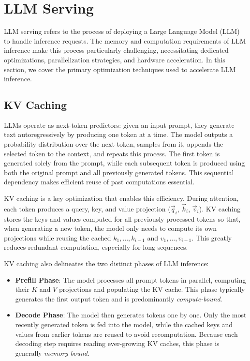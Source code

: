 \section{LLM Serving}
\label{chap:background:sec:serving}

LLM serving refers to the process of deploying a Large Language Model (LLM) to handle inference requests.
The memory and computation requirements of LLM inference make this process particularly challenging, necessitating dedicated optimizations, parallelization strategies, and hardware acceleration. In this section, we cover the primary optimization techniques used to accelerate LLM inference.

\subsection{KV Caching}

LLMs operate as next-token predictors: given an input prompt, they generate text autoregressively by producing one token at a time. The model outputs a probability distribution over the next token, samples from it, appends the selected token to the context, and repeats this process. The first token is generated solely from the prompt, while each subsequent token is produced using both the original prompt and all previously generated tokens. This sequential dependency makes efficient reuse of past computations essential.

KV caching is a key optimization that enables this efficiency. During attention, each token produces a query, key, and value projection ($\vec{q}_i$, $\vec{k}_i$, $\vec{v}_i$). KV caching stores the keys and values computed for all previously processed tokens so that, when generating a new token, the model only needs to compute its own projections while reusing the cached $k_1,\dots,k_{i-1}$ and $v_1,\dots,v_{i-1}$. This greatly reduces redundant computation, especially for long sequences.

KV caching also delineates the two distinct phases of LLM inference:

\begin{itemize}
    \item \textbf{Prefill Phase}: The model processes all prompt tokens in parallel, computing their $K$ and $V$ projections and populating the KV cache. This phase typically generates the first output token and is predominantly \emph{compute-bound}.
    
    \item \textbf{Decode Phase}: The model then generates tokens one by one. Only the most recently generated token is fed into the model, while the cached keys and values from earlier tokens are reused to avoid recomputation. Because each decoding step requires reading ever-growing KV caches, this phase is generally \emph{memory-bound}.
\end{itemize}


